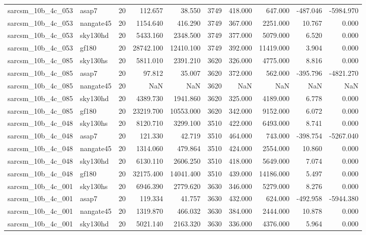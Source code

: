 \begin{tabular}{llrrrrrrrr}
sarcsm\_10b\_4c\_053 & asap7 & 20 & 112.657 & 38.550 & 3749 & 418.000 & 647.000 & -487.046 & -5984.970 \\
sarcsm\_10b\_4c\_053 & nangate45 & 20 & 1154.640 & 416.290 & 3749 & 367.000 & 2251.000 & 10.767 & 0.000 \\
sarcsm\_10b\_4c\_053 & sky130hd & 20 & 5433.160 & 2348.500 & 3749 & 377.000 & 5079.000 & 6.520 & 0.000 \\
sarcsm\_10b\_4c\_053 & gf180 & 20 & 28742.100 & 12410.100 & 3749 & 392.000 & 11419.000 & 3.904 & 0.000 \\
sarcsm\_10b\_4c\_085 & sky130hs & 20 & 5811.010 & 2391.210 & 3620 & 326.000 & 4775.000 & 8.816 & 0.000 \\
sarcsm\_10b\_4c\_085 & asap7 & 20 & 97.812 & 35.007 & 3620 & 372.000 & 562.000 & -395.796 & -4821.270 \\
sarcsm\_10b\_4c\_085 & nangate45 & 20 & NaN & NaN & 3620 & NaN & NaN & NaN & NaN \\
sarcsm\_10b\_4c\_085 & sky130hd & 20 & 4389.730 & 1941.860 & 3620 & 325.000 & 4189.000 & 6.778 & 0.000 \\
sarcsm\_10b\_4c\_085 & gf180 & 20 & 23219.700 & 10553.000 & 3620 & 342.000 & 9152.000 & 6.072 & 0.000 \\
sarcsm\_10b\_4c\_048 & sky130hs & 20 & 8120.710 & 3299.100 & 3510 & 422.000 & 6493.000 & 8.741 & 0.000 \\
sarcsm\_10b\_4c\_048 & asap7 & 20 & 121.330 & 42.719 & 3510 & 464.000 & 743.000 & -398.754 & -5267.040 \\
sarcsm\_10b\_4c\_048 & nangate45 & 20 & 1314.060 & 479.864 & 3510 & 424.000 & 2554.000 & 10.860 & 0.000 \\
sarcsm\_10b\_4c\_048 & sky130hd & 20 & 6130.110 & 2606.250 & 3510 & 418.000 & 5649.000 & 7.074 & 0.000 \\
sarcsm\_10b\_4c\_048 & gf180 & 20 & 32175.400 & 14041.400 & 3510 & 439.000 & 14186.000 & 5.497 & 0.000 \\
sarcsm\_10b\_4c\_001 & sky130hs & 20 & 6946.390 & 2779.620 & 3630 & 346.000 & 5279.000 & 8.276 & 0.000 \\
sarcsm\_10b\_4c\_001 & asap7 & 20 & 119.334 & 41.757 & 3630 & 432.000 & 624.000 & -492.958 & -5944.380 \\
sarcsm\_10b\_4c\_001 & nangate45 & 20 & 1319.870 & 466.032 & 3630 & 384.000 & 2444.000 & 10.878 & 0.000 \\
sarcsm\_10b\_4c\_001 & sky130hd & 20 & 5021.140 & 2163.320 & 3630 & 336.000 & 4376.000 & 5.964 & 0.000 \\

\end{tabular}
